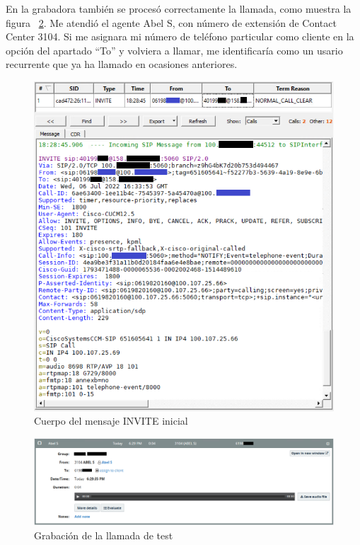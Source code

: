 \documentclass[a4paper, 12pt]{book}
\begin{document}
En la grabadora también se procesó correctamente la llamada, como muestra la figura ~\ref{figura:fig_grab_test}. Me atendió el agente Abel S, con número de extensión de Contact Center 3104. Si me asignara mi número de teléfono particular como cliente en la opción del apartado ``To'' y volviera a llamar, me identificaría como un usario recurrente que ya ha llamado en ocasiones anteriores.

\begin{figure}
  \centering
  \includegraphics[scale = 0.9]{img/fig_sipflow_param1}
  \caption{Cuerpo del mensaje INVITE inicial}
  \label{figura:fig_sipflow_param1}
\end{figure}

\begin{figure}[h!]
  \centering
  \includegraphics[scale = 0.7]{img/fig_grab_test}
  \caption{Grabación de la llamada de test}
  \label{figura:fig_grab_test}
\end{figure}
\end{document}
